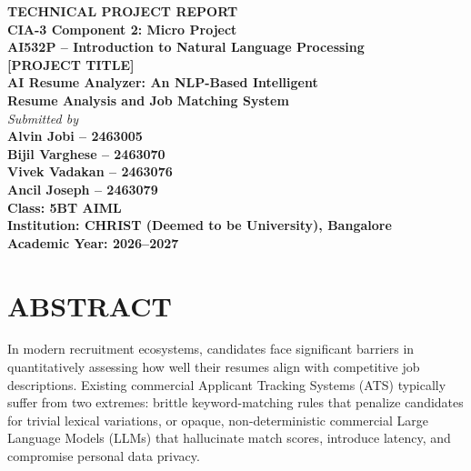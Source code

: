 \documentclass[11pt,a4paper]{article}
\begin{document}
\thispagestyle{fancy}
\begin{center}
    \vspace*{0.8cm}
    {\Large \textbf{TECHNICAL PROJECT REPORT}}\\[0.3cm]
    {\large \textbf{CIA-3 Component 2: Micro Project}}\\[0.2cm]
    {\large \textbf{AI532P -- Introduction to Natural Language Processing}}\\[1.2cm]
    
    {\LARGE \textbf{\color{primaryblue}[PROJECT TITLE]}}\\[0.3cm]
    {\LARGE \textbf{\color{primaryblue}AI Resume Analyzer: An NLP-Based Intelligent}}\\[0.15cm]
    {\LARGE \textbf{\color{primaryblue}Resume Analysis and Job Matching System}}\\[1.5cm]
    
    {\normalsize \textit{Submitted by}}\\[0.4cm]
    {\large \textbf{Alvin Jobi -- 2463005}}\\[0.2cm]
    {\large \textbf{Bijil Varghese -- 2463070}}\\[0.2cm]
    {\large \textbf{Vivek Vadakan -- 2463076}}\\[0.2cm]
    {\large \textbf{Ancil Joseph -- 2463079}}\\[1.8cm]
    
    {\large \textbf{Class: 5BT AIML}}\\[0.2cm]
    {\large \textbf{Institution: CHRIST (Deemed to be University), Bangalore}}\\[0.2cm]
    {\large \textbf{Academic Year: 2026--2027}}\\[1.5cm]
\end{center}

\newpage

\section*{ABSTRACT}
In modern recruitment ecosystems, candidates face significant barriers in quantitatively assessing how well their resumes align with competitive job descriptions. Existing commercial Applicant Tracking Systems (ATS) typically suffer from two extremes: brittle keyword-matching rules that penalize candidates for trivial lexical variations, or opaque, non-deterministic commercial Large Language Models (LLMs) that hallucinate match scores, introduce latency, and compromise personal data privacy. 
\end{document}
